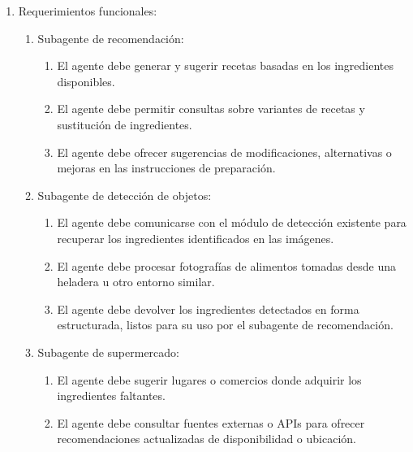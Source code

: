 \documentclass[
11pt, %
]{charter}
\begin{document}
\begin{enumerate}
	\item Requerimientos funcionales:
	\begin{enumerate}
		\item Subagente de recomendación:
        \begin{enumerate}
            \item El agente debe generar y sugerir recetas basadas en los ingredientes disponibles.
            \item El agente debe permitir consultas sobre variantes de recetas y sustitución de ingredientes.
            \item El agente debe ofrecer sugerencias de modificaciones, alternativas o mejoras en las instrucciones de preparación.
        \end{enumerate}

        \item Subagente de detección de objetos:
        \begin{enumerate}
            \item El agente debe comunicarse con el módulo de detección existente para recuperar los ingredientes identificados en las imágenes.
            \item El agente debe procesar fotografías de alimentos tomadas desde una heladera u otro entorno similar.
            \item El agente debe devolver los ingredientes detectados en forma estructurada, listos para su uso por el subagente de recomendación.
        \end{enumerate}

        \item Subagente de supermercado:
        \begin{enumerate}
            \item El agente debe sugerir lugares o comercios donde adquirir los ingredientes faltantes.
            \item El agente debe consultar fuentes externas o APIs para ofrecer recomendaciones actualizadas de disponibilidad o ubicación.
        \end{enumerate}

		
       
    


\end{enumerate}
\end{enumerate}
\end{document}

